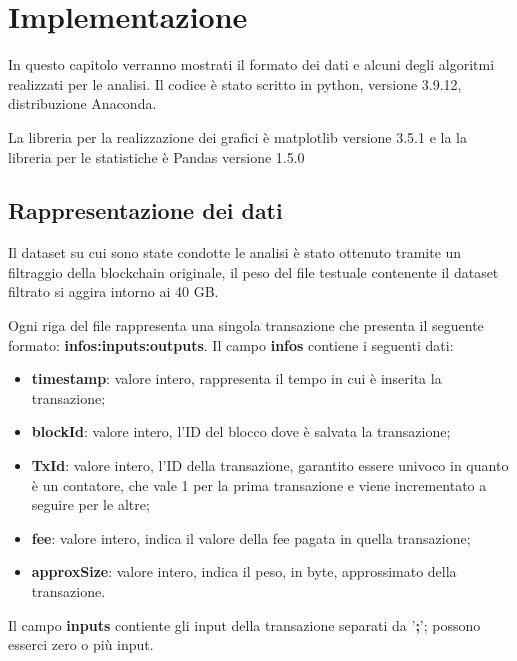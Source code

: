 \chapter{Implementazione}
In questo capitolo verranno mostrati il formato dei dati e alcuni degli algoritmi realizzati per le analisi.
Il codice è stato scritto in python, versione 3.9.12, distribuzione Anaconda.

La libreria per la realizzazione dei grafici è matplotlib versione 3.5.1 e la la libreria per le statistiche è Pandas versione 1.5.0

\section{Rappresentazione dei dati}
Il dataset su cui sono state condotte le analisi è stato ottenuto tramite un filtraggio della blockchain originale, il peso del file testuale contenente il dataset filtrato si aggira intorno ai 40 GB.

Ogni riga del file rappresenta una singola transazione che presenta il seguente formato:
\textbf{infos:inputs:outputs}.
Il campo \textbf{infos} contiene i seguenti dati:
\begin{itemize}
    \item \textbf{timestamp}: valore intero, rappresenta il tempo in cui è inserita la transazione;
    \item \textbf{blockId}: valore intero, l'ID del blocco dove è salvata la transazione;
    \item \textbf{TxId}: valore intero, l'ID della transazione, garantito essere univoco in quanto è un contatore, che vale 1 per la prima transazione e viene incrementato a seguire per le altre;
    \item \textbf{fee}: valore intero, indica il valore della fee pagata in quella transazione;
    \item \textbf{approxSize}: valore intero, indica il peso, in byte, approssimato della transazione.
\end{itemize}
Il campo \textbf{inputs} contiente gli input della transazione separati da '\textbf{;}'; possono esserci zero o più input.

